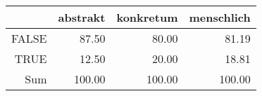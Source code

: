 \begin{tabular}{rrrr}
  \hline
 & abstrakt & konkretum & menschlich \\ 
  \hline
FALSE & 87.50 & 80.00 & 81.19 \\ 
  TRUE & 12.50 & 20.00 & 18.81 \\ 
  Sum & 100.00 & 100.00 & 100.00 \\ 
   \hline
\end{tabular}
